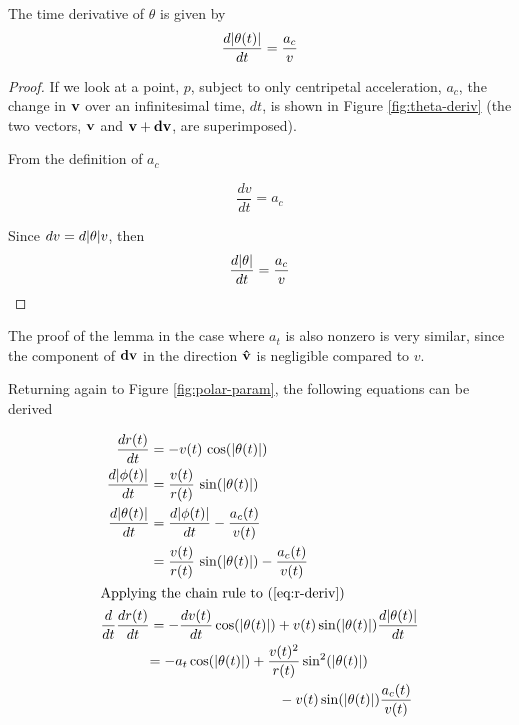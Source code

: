 \begin{lemma}
The time derivative of $\theta$ is given by
\[
\frac{d\abs{\theta(t)}}{dt} = \frac{a_c}{v}
\]
\end{lemma}

\begin{proof}

If we look at a point, $p$, subject to only centripetal acceleration, $a_c$, the change in $\mathbf{v}$ over an infinitesimal time, $dt$, is shown in Figure \ref{fig:theta-deriv} (the two vectors, $\mathbf{v}$ and $\mathbf{v}+\mathbf{dv}$, are superimposed). 


From the definition of $a_c$

\[
\frac{dv}{dt} = a_c
\]

Since $dv = d\abs{\theta} v$, then
\[
\frac{d\abs{\theta}}{dt} = \frac{a_c}{v}
\]
\end{proof}

The proof of the lemma in the case where $a_t$ is also nonzero is very similar, since the component of $\mathbf{dv}$ in the direction $\mathbf{\hat{v}}$ is negligible compared to $v$.

Returning again to Figure \ref{fig:polar-param}, the following equations can be derived

\begin{align}
  \frac{dr(t)}{dt}& = -v(t) \, \cos\paren{\abs{\theta(t)}}\label{eq:r-deriv}\\
  \frac{d\abs{\phi(t)}}{dt}& = \frac{v(t)}{r(t)} \, \sin\paren{\abs{\theta(t)}}\label{eq:phi-deriv}\\
  \frac{d\abs{\theta(t)}}{dt}& = \frac{d\abs{\phi(t)}}{dt} - \frac{a_c(t)}{v(t)}\\
  &= \frac{v(t)}{r(t)} \, \sin\paren{\abs{\theta(t)}} - \frac{a_c(t)}{v(t)}\label{eq:theta-deriv}\\
  \intertext{Applying the chain rule to (\ref{eq:r-deriv})}
  \frac{d}{dt} \frac{dr(t)}{dt}& = -\frac{dv(t)}{dt} \cos\paren{\abs{\theta(t)}} + v(t) \sin\paren{\abs{\theta(t)}} \frac{d\abs{\theta(t)}}{dt}\\
  &\begin{aligned}
    = -a_t \cos\paren{\abs{\theta(t)}} &+ \frac{v(t)^2}{r(t)} \sin^2\paren{\abs{\theta(t)}}\\
    &\qquad - v(t) \sin\paren{\abs{\theta(t)}} \frac{a_c(t)}{v(t)}\label{eq:r-deriv-2}
  \end{aligned}
\end{align}

